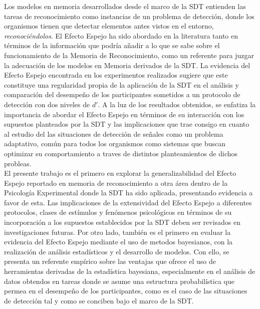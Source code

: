 Los modelos en memoria desarrollados desde el marco de la SDT entienden las tareas de reconocimiento como instancias de un problema de detección, donde los organismos tienen que detectar elementos antes vistos en el entorno, \textit{reconociéndolos}. El Efecto Espejo ha sido abordado en la literatura tanto en términos de la  información que podría añadir a lo que se sabe sobre el funcionamiento de la Memoria de Reconocimiento, como un referente para juzgar la adecuación de los modelos en Memoria derivados de la SDT. La evidencia del Efecto Espejo encontrada en los experimentos realizados sugiere que este constituye una regularidad propia de la aplicación de la SDT en el análisis y comparación del desempeño de los participantes sometidos a un protocolo de detección con dos niveles de $d'$. A la luz de los resultados obtenidos, se enfatiza la importancia de abordar el Efecto Espejo en términos de su interacción con los supuestos planteados por la SDT y las implicaciones que trae consigo en cuanto al estudio del las situaciones de detección de señales como un problema adaptativo, común para todos los organismos como sistemas que buscan optimizar su comportamiento a traves de distintos planteamientos de dichos probleas.\\

El presente trabajo es el primero en explorar la generalizabilidad del Efecto Espejo reportado en memoria de reconocimiento a otra área dentro de la Psicología Experimental donde la SDT ha sido aplicada, presentando evidencia a favor de esta. Las implicaciones de la extensividad del Efecto Espejo a diferentes protocolos, clases de estímulos y fenómenos psicológicos en términos de su incorporación a los supuestos establecidos por la SDT deben ser revisados en investigaciones futuras. Por otro lado, también es el primero en evaluar la evidencia del Efecto Espejo mediante el uso de metodos bayesianos, con la realización de análisis estadísticos y el desarrollo de modelos. Con ello, se presenta un referente empírico sobre las ventajas que ofrece el uso de herramientas derivadas de la estadística bayesiana, especialmente en el análisis de datos obtendos en tareas donde se asume una estructura probabilística que permea en el desempeño de los participantes, como es el caso de las situaciones de detección tal y como se conciben bajo el marco de la SDT.\\









